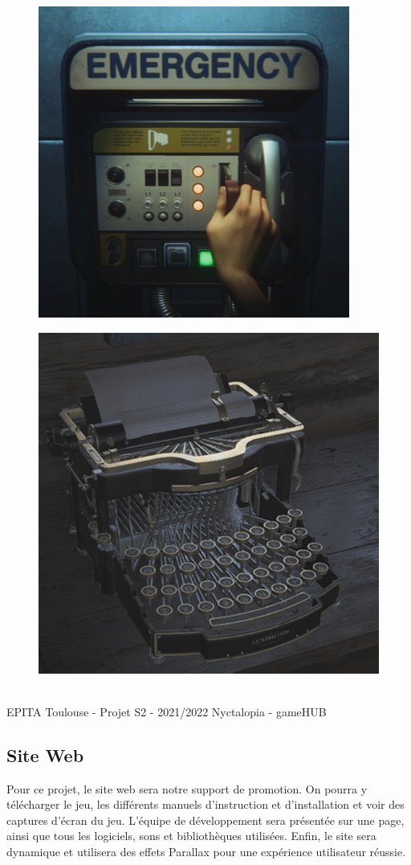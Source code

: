 \begin{figure}[H]
\centering
\begin{minipage}{.5\textwidth}
  \centering
  \includegraphics[width=.6\linewidth]{img/savealien.jpg}
  \label{fig:alienisolation}
\end{minipage}%
\begin{minipage}{.5\textwidth}
  \centering
  \includegraphics[width=.6\linewidth]{img/savere8.jpg}
  \label{fig:residentevil8}
\end{minipage}
\end{figure}

\vfill
\noindent\makebox[\linewidth]{\rule{.8\paperwidth}{.6pt}}\\[0.2cm]
EPITA Toulouse - Projet S2 - 2021/2022 \hfill Nyctalopia - gameHUB
\noindent\makebox[\linewidth]{\rule{.8\paperwidth}{.6pt}}

\subsection{Site Web}
\setlength{\parindent}{5ex}
Pour ce projet, le site web sera notre support de promotion. On pourra y télécharger le jeu, les différents manuels d'instruction et d'installation et voir des captures d'écran du jeu. L'équipe de développement sera présentée sur une page, ainsi que tous les logiciels, sons et bibliothèques utilisées. Enfin, le site sera dynamique et utilisera des effets Parallax pour une expérience utilisateur réussie.

